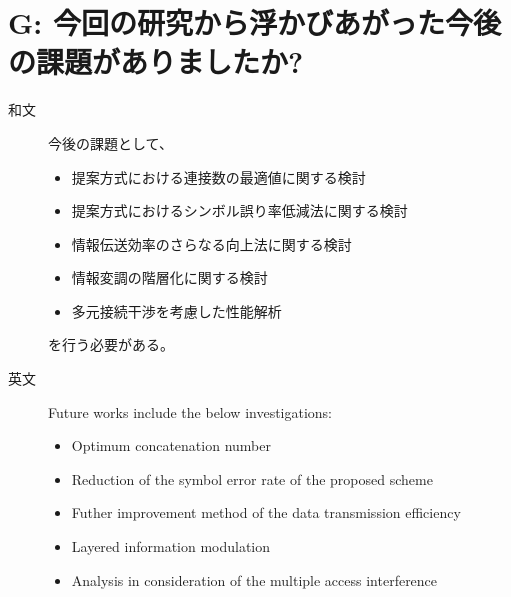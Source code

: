 ﻿\documentclass[a4j,10pt]{jarticle}
\begin{document}
\section{G: 今回の研究から浮かびあがった今後の課題がありましたか?} %
\begin{description} 
 \item[和文] 今後の課題として、
\begin{itemize}
 \item 提案方式における連接数の最適値に関する検討
 \item 提案方式におけるシンボル誤り率低減法に関する検討
 \item 情報伝送効率のさらなる向上法に関する検討
 \item 情報変調の階層化に関する検討
 \item 多元接続干渉を考慮した性能解析
\end{itemize}
を行う必要がある。
%
 \item[英文] Future works include the below investigations:
 \begin{itemize}
  \item Optimum concatenation number 
  \item Reduction of the symbol error rate of the proposed scheme 
  \item Futher improvement method of the data transmission efficiency 
  \item Layered information modulation 
  \item Analysis in consideration of the multiple access interference
 \end{itemize}
\end{description}
%
\end{document}
